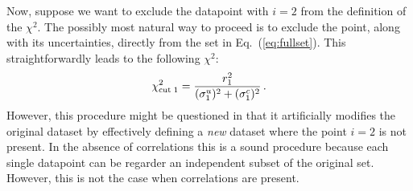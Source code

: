 \documentclass[10pt,a4paper]{article}
\begin{document}
Now, suppose we want to exclude the datapoint with $i=2$ from the
definition of the $\chi^2$. The possibly most natural way to proceed
is to exclude the point, along with its uncertainties, directly from
the set in Eq.~(\ref{eq:fullset}). This straightforwardly leads to the
following $\chi^2$:
\begin{equation}\label{eq:redchi21}
{\chi}_{\rm cut\;1}^2 = \frac{r_1^2}{(\sigma_1^u)^2+ (\sigma_1^c)^2}\,.
\end{equation}
However, this procedure might be questioned in that it artificially
modifies the original dataset by effectively defining a \textit{new}
dataset where the point $i=2$ is not present. In the absence of
correlations this is a sound procedure because each single datapoint
can be regarder an independent subset of the original
set. However, this is not the case when correlations are present.
\end{document}
